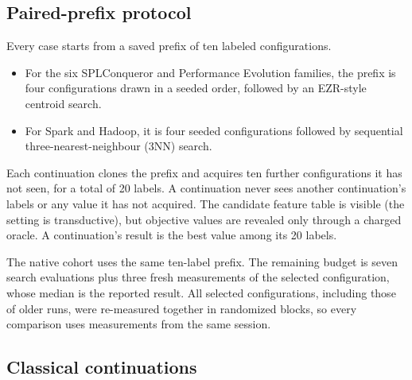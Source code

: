\subsection{Paired-prefix protocol}

Every case starts from a saved prefix of ten labeled configurations.
\begin{itemize}
  \item For the six SPLConqueror and Performance Evolution families, the prefix is four configurations drawn in a seeded order, followed by an EZR-style centroid search.
  \item For Spark and Hadoop, it is four seeded configurations followed by sequential three-nearest-neighbour (3NN) search.
\end{itemize}
Each continuation clones the prefix and acquires ten further configurations it has not seen, for a total of 20 labels. A continuation never sees another continuation's labels or any value it has not acquired. The candidate feature table is visible (the setting is transductive), but objective values are revealed only through a charged oracle. A continuation's result is the best value among its 20 labels.

The native cohort uses the same ten-label prefix. The remaining budget is seven search evaluations plus three fresh measurements of the selected configuration, whose median is the reported result. All selected configurations, including those of older runs, were re-measured together in randomized blocks, so every comparison uses measurements from the same session.

\subsection{Classical continuations}


